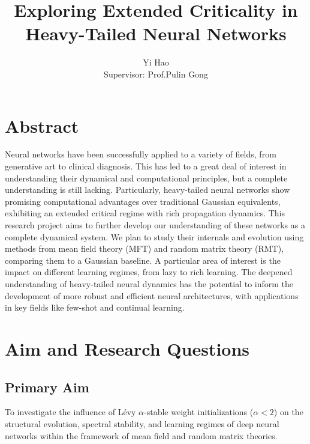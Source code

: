 \documentclass[11pt,a4paper]{article}
\author{Yi Hao \vspace{0.35cm} \\ Supervisor: Prof.\;Pulin Gong}
\title{Exploring Extended Criticality in Heavy-Tailed Neural Networks}
\begin{document}
\maketitle
\section{Abstract}
Neural networks have been successfully applied to a variety of fields, from generative art to clinical diagnosis. This has led to a great deal of interest in understanding their dynamical and computational principles, but a complete understanding is still lacking. Particularly, heavy-tailed neural networks show promising computational advantages over traditional Gaussian equivalents, exhibiting an extended critical regime with rich propagation dynamics. This research project aims to further develop our understanding of these networks as a complete dynamical system. We plan to study their internals and evolution using methods from mean field theory (MFT) and random matrix theory (RMT), comparing them to a Gaussian baseline. A particular area of interest is the impact on different learning regimes, from lazy to rich learning. The deepened understanding of heavy-tailed neural dynamics has the potential to inform the development of more robust and efficient neural architectures, with applications in key fields like few-shot and continual learning.
\section{Aim and Research Questions}
\subsection{Primary Aim}
To investigate the influence of Lévy $\alpha$-stable weight initializations ($\alpha < 2$) on the structural evolution, spectral stability, and learning regimes of deep neural networks within the framework of mean field and random matrix theories.
\end{document}
